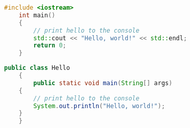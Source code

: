 \documentclass{article}
\begin{document}
	
	\begin{lstlisting}[language=C++, caption={C++ code using listings}]
	#include <iostream>
	int main()
	{
		// print hello to the console
		std::cout << "Hello, world!" << std::endl;
		return 0;
	}
	\end{lstlisting}
	
	\begin{lstlisting}[language=Java, caption={Java code using listings}]
	public class Hello
	{
		public static void main(String[] args)
	{
		// print hello to the console
		System.out.println("Hello, world!");
	}
	}
	\end{lstlisting}
	
\end{document}
